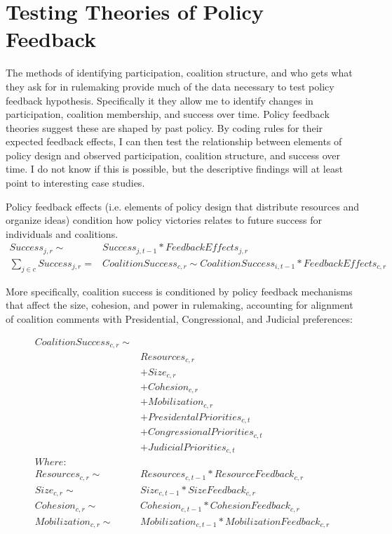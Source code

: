 \section{Testing Theories of Policy Feedback}

The methods of identifying participation, coalition structure, and who gets what they ask for in rulemaking provide much of the data necessary to test policy feedback hypothesis. Specifically it they allow me to identify changes in participation, coalition membership, and success over time. Policy feedback theories suggest these are shaped by past policy. By coding rules for their expected feedback effects, I can then test the relationship between elements of policy design and observed participation, coalition structure, and success over time. I do not know if this is possible, but the descriptive findings will at least point to interesting case studies. 

Policy feedback effects (i.e. elements of policy design that distribute resources and organize ideas) condition how policy victories relates to future success for individuals and coalitions. \begin{align*}
Success_{j, r} \sim & Success_{j, t-1}*FeedbackEffects_{j, r}\\
\sum_{j \in c} Success_{j, r} =  & CoalitionSuccess_{c, r} \sim CoalitionSuccess_{i, t-1}*FeedbackEffects_{c, r}
\end{align*}

More specifically, coalition success is conditioned by policy feedback mechanisms that affect the size, cohesion, and power in rulemaking, accounting for alignment of coalition comments with Presidential, Congressional, and Judicial preferences: 

\begin{align*}
CoalitionSuccess_{c, r} \sim &\\
& Resources_{c, r}  \\
& + Size_{c, r}  \\
& + Cohesion_{c, r} \\
& + Mobilization_{c, r}  \\
& + PresidentalPriorities_{c, t}  \\
& + CongressionalPriorities_{c, t}  \\
& + JudicialPriorities_{c, t}\\
Where: \\
Resources_{c, r} \sim & Resources_{c, t-1}* ResourceFeedback_{c, r}\\
Size_{c, r} \sim & Size_{c, t-1}* SizeFeedback_{c, r}\\
Cohesion_{c, r}  \sim & Cohesion_{c, t-1}* CohesionFeedback_{c, r}\\
Mobilization_{c, r}  \sim & Mobilization_{c, t-1}*MobilizationFeedback_{c, r}
\end{align*}

